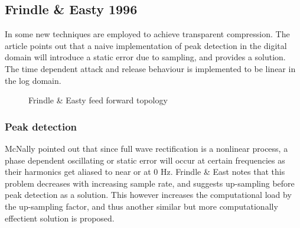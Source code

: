 \documentclass[../main2.tex]{subfiles}
\providecommand{\rootdir}{..}
\begin{document}
\subsection{Frindle \& Easty 1996}
In \cite{frindle1996implementation} some new techniques are employed to achieve transparent compression. The article points out that a naive implementation of peak detection in the digital domain will introduce a static error due to sampling, and provides a solution. The time dependent attack and release behaviour is implemented to be linear in the log domain. 

\begin{figure}[h]
\centerline{}
\caption{Frindle \& Easty feed forward topology}
\label{fig:block_frindle}
\end{figure}

\subsubsection{Peak detection}
McNally \cite{mcnally1984dynamic} pointed out that since full wave rectification is a nonlinear process, a phase dependent oscillating or static error will occur at certain frequencies as their harmonics get aliased to near or at 0 Hz. Frindle \& East notes that this problem decreases with increasing sample rate, and suggests up-sampling before peak detection as a solution. This however increases the computational load by the up-sampling factor, and thus another similar but more computationally effectient solution is proposed.
\end{document}
